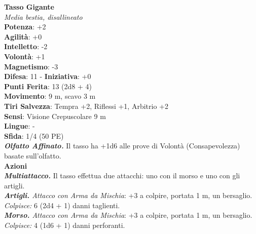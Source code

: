 \begin{multicols}{2}
\medskip\textbf{Tasso Gigante}\\
\emph{Media bestia, disallineato}\\
\textbf{Potenza}: +2\\
\textbf{Agilità}: +0\\
\textbf{Intelletto}: -2\\
\textbf{Volontà}: +1\\
\textbf{Magnetismo}: -3\\
\textbf{Difesa}: 11 - \textbf{Iniziativa}: +0\\
\textbf{Punti Ferita}: 13 (2d8 + 4)\\
\textbf{Movimento}: 9 m, scavo 3 m\\
\textbf{Tiri Salvezza}: Tempra +2, Riflessi +1, Arbitrio +2\\
\textbf{Sensi}: Visione Crepuscolare 9 m \\
\textbf{Lingue}: -\\
\textbf{Sfida}: 1/4 (50 PE)\smallskip\\
\emph{\textbf{Olfatto Affinato.}} Il tasso ha +1d6 alle prove di Volontà (Consapevolezza) basate sull'olfatto.\\
\smallskip\textbf{Azioni}\\
\emph{\textbf{Multiattacco.}} Il tasso effettua due attacchi: uno con il morso e uno con gli artigli.\\
\emph{\textbf{Artigli.} Attacco con Arma da Mischia}: +3 a colpire, portata 1 m, un bersaglio.\\
\emph{Colpisce:} 6 (2d4 + 1) danni taglienti.\\
\emph{\textbf{Morso.} Attacco con Arma da Mischia}: +3 a colpire, portata 1 m, un bersaglio.\\
\emph{Colpisce:} 4 (1d6 + 1) danni perforanti.\\


\end{multicols}
